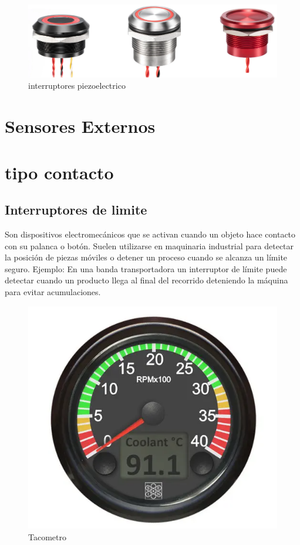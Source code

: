 \begin{figure}[h]
	\centering
	\includegraphics[width=0.7\linewidth]{img/int piezoelectrico.png}
	\caption{interruptores piezoelectrico}
	\label{fig:insertarimagen}
\end{figure}

\section{Sensores Externos}
\section{tipo contacto}
\subsection{Interruptores de limite}
Son dispositivos electromecánicos que se activan cuando un objeto hace contacto con su palanca o botón. Suelen utilizarse en maquinaria industrial para detectar la posición de piezas móviles o detener un proceso cuando se alcanza un límite seguro.
Ejemplo: En una banda transportadora un interruptor de límite puede detectar cuando un producto llega al final del recorrido deteniendo la máquina para evitar acumulaciones.


\begin{figure}[h]
	\centering
	\includegraphics[width=0.7\linewidth]{img/tacometro.png}
	\caption{Tacometro}
	\label{fig:insertarimagen}
\end{figure}
